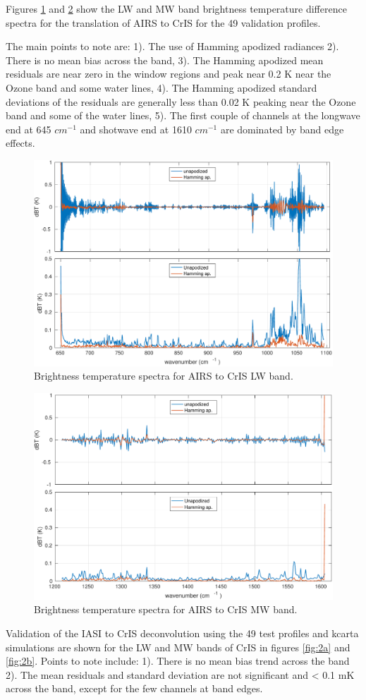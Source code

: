 \documentclass[11pt]{article}
\begin{document}
Figures \ref{fig:1a} and \ref{fig:1b} show the LW and MW band brightness temperature difference spectra for the translation of AIRS to CrIS for the 49 validation profiles.

The main points to note are: 1). The use of Hamming apodized radiances 2). There is no mean bias across the band, 3). The Hamming apodized mean residuals are near zero in the window regions and peak near 0.2 K near the Ozone band and some water lines, 4). The Hamming apodized standard deviations of the residuals are generally less than 0.02 K peaking near the Ozone band and some of the water lines, 5). The first couple of channels at the longwave end at 645 \(cm^{-1}\) and shotwave end at 1610 \(cm^{-1}\) are dominated by band edge effects.

\begin{figure}[htb]
\centering
\includegraphics[width=.6\linewidth]{./figs/airs2cris_vs_truth_LW.pdf}
\caption{\label{fig:orgparagraph1}
  Brightness temperature spectra for AIRS to CrIS LW band.}
\label{fig:1a}
\end{figure}

\begin{figure}[htb]
\centering
\includegraphics[width=.6\linewidth]{./figs/airs2cris_vs_truth_MW.pdf}
\caption{\label{fig:orgparagraph2}
  Brightness temperature spectra for AIRS to CrIS MW band.}
\label{fig:1b}
\end{figure}

Validation of the IASI to CrIS deconvolution using the 49 test profiles and kcarta simulations are shown for the LW and MW bands of CrIS in figures \ref{fig:2a} and \ref{fig:2b}. Points to note include: 1). There is no mean bias trend across the band 2). The mean residuals and standard deviation are not significant and < 0.1 mK across the band, except for the few channels at band edges.
\end{document}
